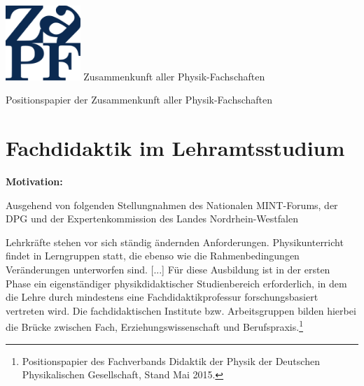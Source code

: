 \documentclass[DIV=calc]{scrartcl}
\begin{document}
\hspace{0.87\textwidth}
\begin{minipage}{120pt}
\vspace{-1.8cm}
\includegraphics[width=80pt]{logo.pdf}
\centering
\small Zusammenkunft aller Physik-Fachschaften
\end{minipage}
\begin{center}
\huge{Positionspapier der Zusammenkunft aller Physik-Fachschaften} \\
\normalsize
\end{center}

\vspace{1cm}
\section*{Fachdidaktik im Lehramtsstudium}

\textbf{Motivation:}

Ausgehend von folgenden Stellungnahmen des Nationalen MINT-Forums, der DPG und der Expertenkommission des Landes Nordrhein-Westfalen

\glqq Lehrkräfte stehen vor sich ständig ändernden Anforderungen. Physikunterricht findet in Lerngruppen statt, die ebenso wie die Rahmenbedingungen Veränder\-ungen unterworfen sind. [...] Für diese Ausbildung ist in der ersten Phase ein eigenständiger physikdidaktischer Studienbereich erforderlich, in dem die Lehre durch mindestens eine Fachdidaktikprofessur forschungsbasiert vertreten wird. Die fachdidaktischen Institute bzw. Arbeitsgruppen bilden hierbei die Brücke zwischen Fach, Erziehungswissenschaft und Berufspraxis.\grqq\footnote{Positionspapier des Fachverbands Didaktik der Physik der Deutschen Physikalischen Gesellschaft, Stand Mai 2015.}
\end{document}

